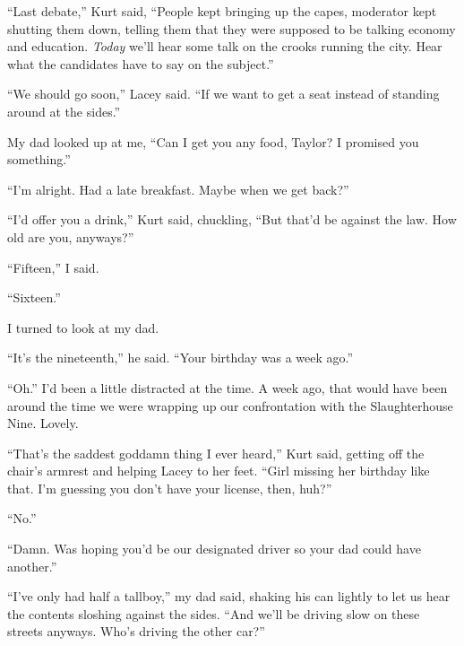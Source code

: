 ``Last debate,'' Kurt said, ``People kept bringing up the capes, moderator kept shutting them down, telling them that they were supposed to be talking economy and education.  \emph{Today} we'll hear some talk on the crooks running the city.  Hear what the candidates have to say on the subject.''



``We should go soon,'' Lacey said.  ``If we want to get a seat instead of standing around at the sides.''



My dad looked up at me, ``Can I get you any food, Taylor?  I promised you something.''



``I'm alright.  Had a late breakfast.  Maybe when we get back?''



``I'd offer you a drink,'' Kurt said, chuckling, ``But that'd be against the law.  How old are you, anyways?''



``Fifteen,'' I said.



``Sixteen.''



I turned to look at my dad.



``It's the nineteenth,'' he said.  ``Your birthday was a week ago.''



``Oh.''  I'd been a little distracted at the time.  A week ago, that would have been around the time we were wrapping up our confrontation with the Slaughterhouse Nine.  Lovely.



``That's the saddest goddamn thing I ever heard,'' Kurt said, getting off the chair's armrest and helping Lacey to her feet.  ``Girl missing her birthday like that.  I'm guessing you don't have your license, then, huh?''



``No.''



``Damn.  Was hoping you'd be our designated driver so your dad could have another.''



``I've only had half a tallboy,'' my dad said, shaking his can lightly to let us hear the contents sloshing against the sides.  ``And we'll be driving slow on these streets anyways.  Who's driving the other car?''



